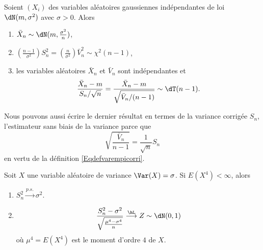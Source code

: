 \begin{theorem}     \label{ThoCochraneChiStudent}  
	Soient \( (X_i)\) des variables aléatoires gaussiennes indépendantes de loi \( \dN(m,\sigma^2)\) avec \( \sigma>0\). Alors
	\begin{enumerate}
		\item
		      \( \bar X_n\sim\dN(m,\frac{ \sigma^2 }{ n })\),
		\item       \label{ItemThoCochraneChiStudentii}
		      \( \left( \frac{ n-1 }{ \sigma^2 } \right)S_n^2=\left( \frac{ n }{ \sigma^2 } \right)\bar V_n^2\sim\chi^2(n-1)\),
		\item
		      les variables aléatoires \( \bar X_n\) et \( \bar V_n\) sont indépendantes et
		      \begin{equation}
			      \frac{ \bar X_n-m }{ S_n/\sqrt{n} }=\frac{ \bar X_n-m }{ \sqrt{\bar V_n/(n-1)} }\sim\dT(n-1).
		      \end{equation}
	\end{enumerate}
\end{theorem}
Nous pouvons aussi écrire le dernier résultat en termes de la variance corrigée \( S_n\), l'estimateur sans biais de la variance parce que
\begin{equation}
	\sqrt{\frac{ \bar V_n }{ n-1 }}=\frac{1}{ \sqrt{n} }S_n
\end{equation}
en vertu de la définition \eqref{Eqdefvarempicorri}.


\begin{proposition}
	Soit \( X\) une variable aléatoire de variance \( \Var(X)=\sigma\). Si \( E(X^4)<\infty\), alors
	\begin{enumerate}
		\item
		      \( S_n^2\stackrel{p.s.}{\longrightarrow}\sigma^2\).
		\item
		      \begin{equation}
			      \frac{ S_n^2-\sigma^2 }{ \sqrt{\frac{ \mu^4-\sigma^4 }{ n }} }\stackrel{\hL}{\longrightarrow}Z\sim\dN(0,1)
		      \end{equation}
		      où \( \mu^4=E(X^4)\) est le moment d'ordre \( 4\) de \( X\).
	\end{enumerate}
\end{proposition}

